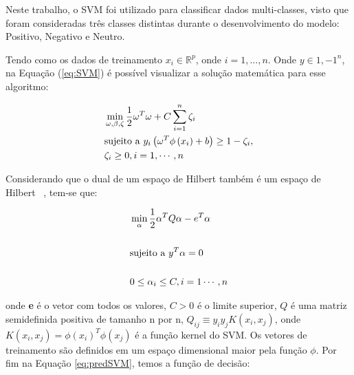 
        Neste trabalho, o SVM foi utilizado para classificar dados multi-classes, visto que foram consideradas três classes distintas durante o desenvolvimento do modelo: Positivo, Negativo e Neutro.
        
        Tendo como os dados de treinamento $x_{i} \in \mathbb{R}^{p}$, onde $i = 1,...,n$. Onde $y \in {1,-1}^n$, na Equação (\ref{eq:SVM}) é
        possível visualizar a solução matemática para esse algoritmo:

        \begin{equation}\label{eq:SVM}
          \begin{aligned}
            & \min_{\omega,\beta, \zeta } \frac{1}{2}\omega^{T}\omega + C \sum_{i=1}^{n}\zeta_{i}\\
            & \textup{sujeito a } y_{i}\left ( \omega^{T}\phi \left ( x_{i} \right ) +b \right )\geq 1 - \zeta_{i},\\
            & \zeta_{i}\geq 0, i = 1,\cdots, n
        \end{aligned}
        \end{equation}

        Considerando que o dual de um espaço de Hilbert também é um espaço de Hilbert ~\cite{lorena2007introduccao}, tem-se que:


        \begin{equation}\label{eq:svmdual}
          \begin{aligned}
            & \min_{\alpha} \frac{1}{2}\alpha^{T}Q\alpha - e^{T}\alpha\\ \\
            & \textup{sujeito a }  y^{T}\alpha = 0 \\ \\
            & 0\leq \alpha_{i}\leq C, i= 1\cdots, n 
        \end{aligned}
        \end{equation}

        onde \textbf{e} é o vetor com todos os valores, $C>0$ é o limite superior, $Q$ é uma matriz semidefinida positiva de tamanho n por n,
        $Q_{ij}\equiv y_{i}y_{j}K(x_{i},x_{j})$, onde $K(x_{i},x_{j}) = \phi(x_{i})^{T}\phi(x_{j})$ é a função kernel do \acrshort{SVM}. Os 
        vetores de treinamento são definidos em um espaço dimensional maior pela função $\phi$.
        Por fim na Equação \ref{eq:predSVM}, temos a função de decisão:

